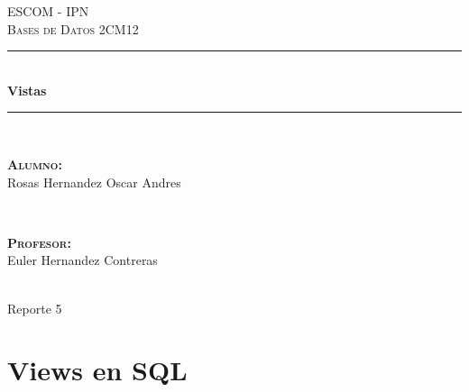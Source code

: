 \documentclass[12pt, fleqn]{article}                             %
\author{Oscar Andrés Rosas}                                     %
\begin{document}
\begin{titlepage}

    \center
    \textsc{\Large ESCOM - IPN}\\[0.5cm] 
    \textsc{\large Bases de Datos 2CM12}\\[1.5cm]

    \rule{\linewidth}{0.5mm} \\[1.0cm]
        { \huge \bfseries Vistas}\\[1.0cm] 
    \rule{\linewidth}{0.5mm} \\[2.0cm]
     
    \begin{minipage}{0.4\textwidth}
        \begin{flushleft} \large
            \textbf{\textsc{Alumno:}}\\
            Rosas Hernandez Oscar Andres
        \end{flushleft}
    \end{minipage}
    ~
    \begin{minipage}{0.4\textwidth}
        \begin{flushright} \large
            \textbf{\textsc{Profesor: }}\\
            Euler Hernandez Contreras
        \end{flushright}
    \end{minipage}\\[3,5cm]

    {\LARGE Reporte 5}\\[4cm] 
    
    
    \vfill

\end{titlepage}









\section{Views en SQL}
\end{document}
